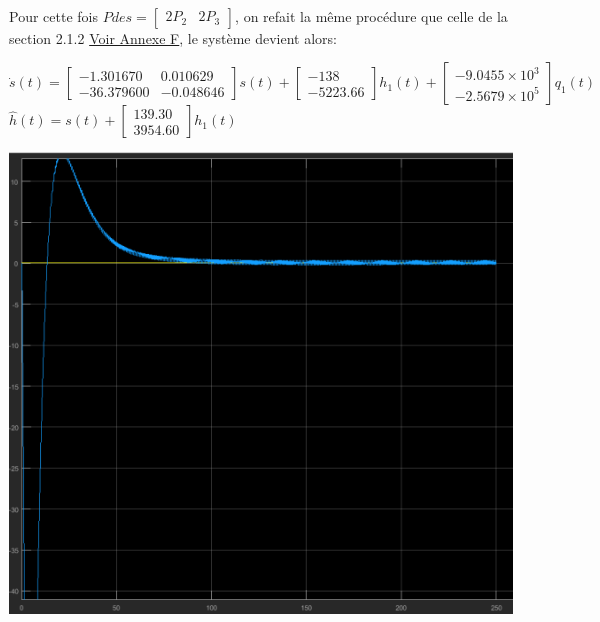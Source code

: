 	    \paragraph{} Pour cette fois $ P{des} = \begin{bmatrix} 2P_2&2P_3 \end{bmatrix}$, on refait la même procédure que celle de la section 2.1.2 \label{calobs2} \hyperref[Annexe F]{Voir Annexe F}, le système devient alors:
	    
	    \begin{center}
	 $\dot s(t)= \begin{bmatrix} -1.301670&0.010629\\-36.379600&-0.048646 \end{bmatrix} s(t) + \begin{bmatrix} -138\\-5223.66 \end{bmatrix} h_1(t)+ \begin{bmatrix} -9.0455 \times 10^{3} \\ -2.5679 \times 10^{5} \end{bmatrix} q_1(t)$\\[0.25cm]
	 $\widehat{h}(t)=s(t)+ \begin{bmatrix} 139.30\\ 3954.60 \end{bmatrix} h_1(t)$\\[0.25cm]
	 \end{center}
	 
	 \begin{center}
		\includegraphics[scale=0.5]{sortie2.png} 
		\label{fig13}
		\end{center}	
		
